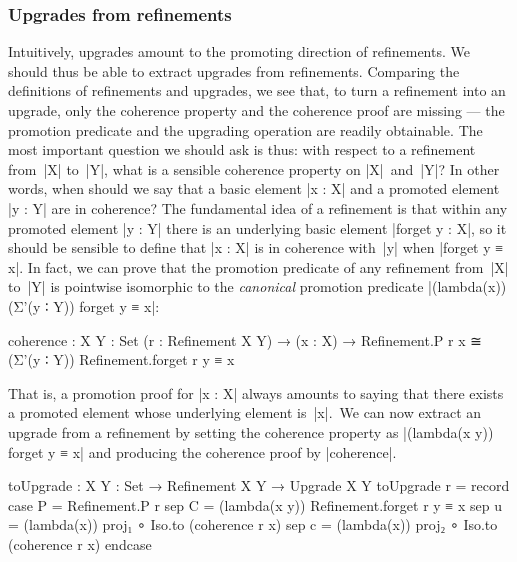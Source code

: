 \subsubsection{Upgrades from refinements}

Intuitively, upgrades amount to the promoting direction of refinements.
We should thus be able to extract upgrades from refinements.
Comparing the definitions of refinements and upgrades, we see that, to turn a refinement into an upgrade, only the coherence property and the coherence proof are missing --- the promotion predicate and the upgrading operation are readily obtainable.
The most important question we should ask is thus: with respect to a refinement from~|X| to~|Y|, what is a sensible coherence property on |X|~and~|Y|?
In other words, when should we say that a basic element |x : X| and a promoted element |y : Y| are in coherence?
The fundamental idea of a refinement is that within any promoted element |y : Y| there is an underlying basic element |forget y : X|, so it should be sensible to define that |x : X| is in coherence with~|y| when |forget y ≡ x|.
In fact, we can prove that the promotion predicate of any refinement from~|X| to~|Y| is pointwise isomorphic to the \emph{canonical} promotion predicate |(lambda(x)) (Σ'(y ∶ Y)) forget y ≡ x|:
\begin{code}
coherence :  {X Y : Set} (r : Refinement X Y) →
             (x : X) → Refinement.P r x ≅ (Σ'(y ∶ Y)) Refinement.forget r y ≡ x
\end{code}
That is, a promotion proof for |x : X| always amounts to saying that there exists a promoted element whose underlying element is~|x|.\
We can now extract an upgrade from a refinement by setting the coherence property as |(lambda(x y)) forget y ≡ x| and producing the coherence proof by |coherence|.
\begin{code}
toUpgrade : {X Y : Set} → Refinement X Y → Upgrade X Y
toUpgrade r = record  case  P  =  Refinement.P r
                      sep   C  =  (lambda(x y)) Refinement.forget r y ≡ x
                      sep   u  =  (lambda(x)) proj₁  ∘ Iso.to (coherence r x)
                      sep   c  =  (lambda(x)) proj₂  ∘ Iso.to (coherence r x) endcase
\end{code}



